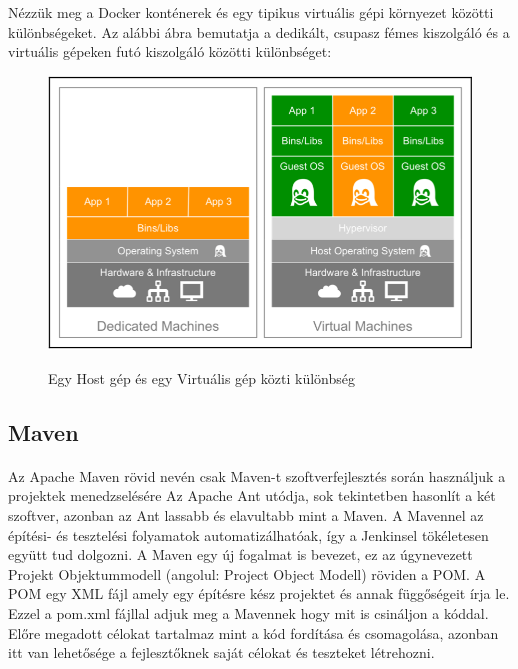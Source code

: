 \pagebreak

Nézzük meg a Docker konténerek és egy tipikus virtuális gépi környezet közötti különbségeket.
Az alábbi ábra bemutatja a dedikált, csupasz fémes kiszolgáló és a virtuális gépeken futó kiszolgáló közötti különbséget:

\begin{figure}[h]
	\centering
	\includegraphics[width=1\linewidth]{figures/host-machine-vs-vm}
	\caption{Egy Host gép és egy Virtuális gép közti különbség}
	\label{fig:hostvsvm}
	\cite{gallagher2015mastering}
\end{figure}

\paragraph{}

\subsection{Maven}
\paragraph{}
Az Apache Maven rövid nevén csak Maven-t szoftverfejlesztés során használjuk a projektek menedzselésére 
Az Apache Ant utódja, sok tekintetben hasonlít a két szoftver, azonban az Ant lassabb és elavultabb mint a Maven. 
A Mavennel az építési- és tesztelési folyamatok automatizálhatóak, így a Jenkinsel tökéletesen együtt tud dolgozni. 
A Maven egy új fogalmat is bevezet, ez az úgynevezett Projekt Objektummodell (angolul: Project Object Modell) röviden a POM. 
A POM egy XML fájl amely egy építésre kész projektet és annak függőségeit írja le. 
Ezzel a pom.xml fájllal adjuk meg a Mavennek hogy mit is csináljon a kóddal.
Előre megadott célokat tartalmaz mint a kód fordítása és csomagolása, azonban itt van lehetősége a fejlesztőknek saját célokat és teszteket létrehozni. 

